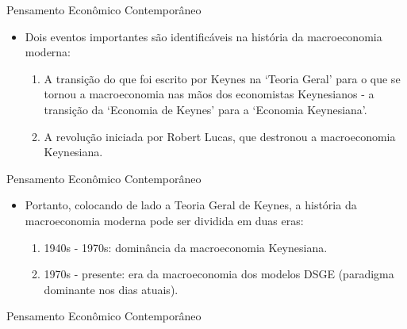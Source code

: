 \documentclass[10pt]{beamer}
\begin{document}
\begin{frame}{Pensamento Econômico Contemporâneo}
    \begin{itemize}
        \item Dois eventos importantes são identificáveis na história da macroeconomia moderna:\medskip
              \begin{enumerate}
                  \item A transição do que foi escrito por Keynes na `Teoria Geral' para o que se tornou a macroeconomia nas mãos dos economistas Keynesianos - a transição da `Economia de Keynes' para a `Economia Keynesiana'.\medskip

                  \item A revolução iniciada por Robert Lucas, que destronou a macroeconomia Keynesiana.
              \end{enumerate}
    \end{itemize}
\end{frame}

\begin{frame}{Pensamento Econômico Contemporâneo}
    \begin{itemize}
        \item Portanto, colocando de lado a Teoria Geral de Keynes, a história da macroeconomia moderna pode ser dividida em duas eras:\medskip

              \begin{enumerate}
                  \item 1940s - 1970s: dominância da macroeconomia Keynesiana.\medskip

                  \item 1970s - presente: era da macroeconomia dos modelos DSGE (paradigma dominante nos dias atuais).
              \end{enumerate}
    \end{itemize}
\end{frame}

\begin{frame}{Pensamento Econômico Contemporâneo}
    \begin{center}
        \begin{minipage}{.8\textwidth}
        \end{minipage}
    \end{center}
\end{frame}
\end{document}
